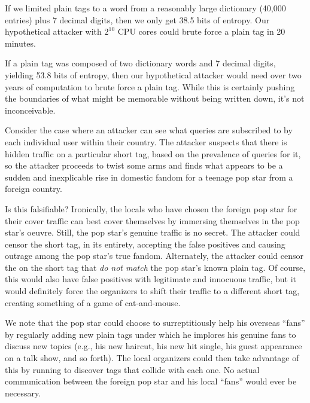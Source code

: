 If we limited plain tags to a word from a reasonably large dictionary
(40,000 entries) plus 7 decimal digits, then we only get 38.5 bits of
entropy.  Our hypothetical attacker with $2^{10}$ CPU cores could brute
force a plain tag in 20 minutes.

If a plain tag was composed of two dictionary words and 7 decimal
digits, yielding 53.8 bits of entropy, then our hypothetical attacker
would need over two years of computation to brute force a plain
tag. While this is certainly pushing the boundaries of what might be
memorable without being written down, it's not inconceivable.

%
Consider the case where an attacker can see what queries are
subscribed to by each individual user within their country. The
attacker suspects that there is hidden traffic on a particular short
tag, based on the prevalence of queries for it, so the attacker
proceeds to twist some arms and finds what appears to be a
sudden and inexplicable rise in domestic fandom for a teenage pop star
from a foreign country.

Is this falsifiable? Ironically, the locals who have chosen the foreign
pop star for their cover traffic can best cover themselves by immersing
themselves in the pop star's oeuvre. Still, the pop star's genuine
traffic is no secret. The attacker could censor the short tag, in its
entirety, accepting the false positives and causing outrage among the
pop star's true fandom. Alternately, the attacker could censor the \msgs
on the short tag that {\em do not match} the pop star's known plain
tag. Of course, this would also have false positives with legitimate and
innocuous traffic, but it would definitely force the organizers to shift
their traffic to a different short tag, creating something of a game of
cat-and-mouse.

We note that the pop star could choose to surreptitiously help his
overseas ``fans'' by regularly adding new plain tags under which he
implores his genuine fans to discuss new topics (e.g., his new
haircut, his new hit single, his guest appearance on a talk show, and
so forth). The local organizers could then take advantage of this by
running  to discover tags that collide with each
one. No actual communication between the foreign pop star and his
local ``fans'' would ever be necessary.
